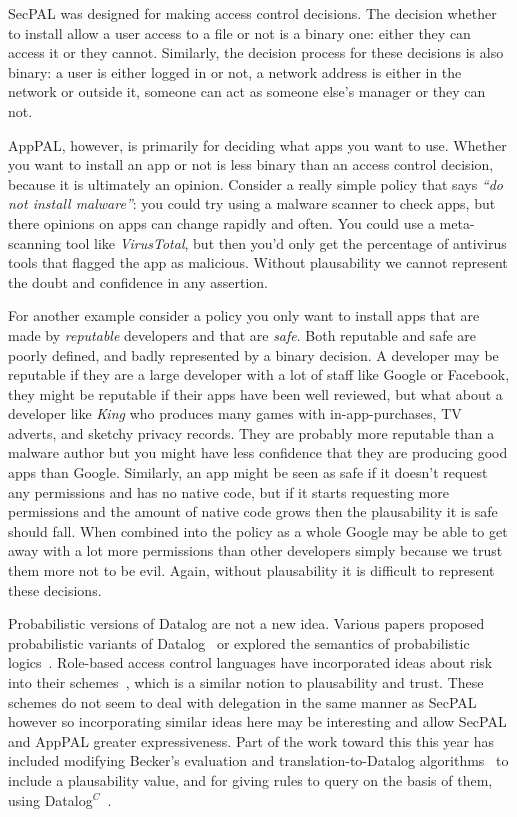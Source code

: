 \documentclass[a4paper]{scrartcl}
\begin{document}
SecPAL was designed for making access control decisions. The decision whether to
install allow a user access to a file or not is a binary one: either they can
access it or they cannot. Similarly, the decision process for these decisions is
also binary: a user is either logged in or not, a network address is either in
the network or outside it, someone can act as someone else's manager or they can
not.

AppPAL, however, is primarily for deciding what apps you want to use. Whether
you want to install an app or not is less binary than an access control
decision, because it is ultimately an opinion. Consider a really simple policy
that says \emph{``do not install malware''}: you could try using a malware
scanner to check apps, but there opinions on apps can change rapidly and often.
You could use a meta-scanning tool like \emph{VirusTotal}, but then you'd only
get the percentage of antivirus tools that flagged the app as malicious. Without
plausability we cannot represent the doubt and confidence in any assertion.

For another example consider a policy you only want to install apps that are
made by \emph{reputable} developers and that are \emph{safe}. Both reputable and
safe are poorly defined, and badly represented by a binary decision. A developer
may be reputable if they are a large developer with a lot of staff like Google
or Facebook, they might be reputable if their apps have been well reviewed, but
what about a developer like \emph{King} who produces many games with
in-app-purchases, TV adverts, and sketchy privacy records. They are probably
more reputable than a malware author but you might have less confidence that
they are producing good apps than Google. Similarly, an app might be seen as safe
if it doesn't request any permissions and has no native code, but if it starts
requesting more permissions and the amount of native code grows then the
plausability it is safe should fall. When combined into the policy as a whole
Google may be able to get away with a lot more permissions than other developers
simply because we trust them more not to be evil. Again, without plausability it
is difficult to represent these decisions.

Probabilistic versions of Datalog are not a new idea.  Various papers proposed
probabilistic variants of Datalog~\cite{fuhr_probabilistic_1995} or explored the
semantics of probabilistic logics~\cite{halpern_analysis_1990}.  Role-based
access control languages have incorporated ideas about risk into their
schemes~\cite{josang_analysing_2004,dimmock_using_2004,salim_approach_2011},
which is a similar notion to plausability and trust.  These schemes do not seem
to deal with delegation in the same manner as SecPAL however so incorporating
similar ideas here may be interesting and allow SecPAL and AppPAL greater
expressiveness.  Part of the work toward this this year has included modifying Becker's
evaluation and translation-to-Datalog algorithms~\cite{becker_secpal:_2010} to
include a plausability value, and for giving rules to query on the basis of
them, using Datalog$^C$~\cite{li_datalog_2003}.
\end{document}
